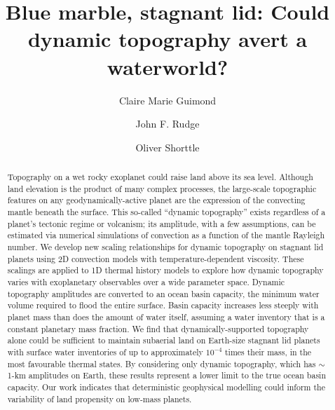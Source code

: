 \documentclass[trackchanges]{aastex63}
\begin{document}
\title{Blue marble, stagnant lid: Could dynamic topography avert a waterworld?}

\author{Claire Marie Guimond}

\author{John F. Rudge}

\author{Oliver Shorttle}


\begin{abstract}

Topography on a wet rocky exoplanet could raise land above its sea level. Although land elevation is the product of many complex processes, the large-scale topographic features on any geodynamically-active planet are the expression of the convecting mantle beneath the surface. This so-called ``dynamic topography'' exists regardless of a planet's tectonic regime or volcanism; its amplitude, with a few assumptions, can be estimated via numerical simulations of convection as a function of the mantle Rayleigh number. We develop new scaling relationships for dynamic topography on stagnant lid planets using 2D convection models with temperature-dependent viscosity. These scalings are applied to 1D thermal history models to explore how dynamic topography varies with exoplanetary observables over a wide parameter space. Dynamic topography amplitudes are converted to an ocean basin capacity, the minimum water volume required to flood the entire surface. Basin capacity increases less steeply with planet mass than does the amount of water itself, assuming a water inventory that is a constant planetary mass fraction. We find that dynamically-supported topography alone could be sufficient to maintain subaerial land on Earth-size stagnant lid planets with surface water inventories of up to approximately $10^{-4}$ times their mass, in the most favourable thermal states. By considering only dynamic topography, which has $\sim$1-km amplitudes on Earth, these results represent a lower limit to the true ocean basin capacity. Our work indicates that deterministic geophysical modelling could inform the variability of land propensity on low-mass planets.

\end{abstract}
\end{document}
